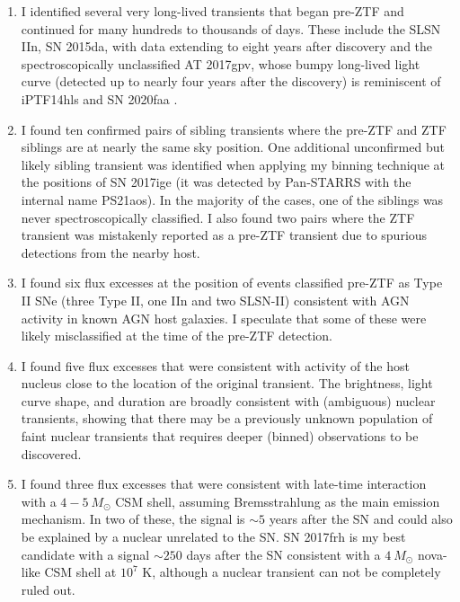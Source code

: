 \documentclass[a4paper,oneside,12pt, class=Latex/Classes/PhDthesisPSnPDF, crop=false]{standalone}
\begin{document}
\begin{enumerate}
    \item I identified several very long-lived transients that began pre-ZTF and continued for many hundreds to thousands of days. These include the SLSN IIn, SN 2015da, with data extending to eight years after discovery and the spectroscopically unclassified AT 2017gpv, whose bumpy long-lived light curve (detected up to nearly four years after the discovery) is reminiscent of iPTF14hls \citep{iPTF14hls_Iair, Sollerman_2019_iptf14hls} and SN 2020faa \citep{Yang_2021_20faa, 2020faa_hidden_shocks}. 
    \item I found ten confirmed pairs of sibling transients where the pre-ZTF and ZTF siblings are at nearly the same sky position. One additional unconfirmed but likely sibling transient was identified when applying my binning technique at the positions of SN 2017ige (it was detected by Pan-STARRS with the internal name PS21aos). In the majority of the cases, one of the siblings was never spectroscopically classified. I also found two pairs where the ZTF transient was mistakenly reported as a pre-ZTF transient due to spurious detections from the nearby host.
    \item I found six flux excesses at the position of events classified pre-ZTF as Type II SNe (three Type II, one IIn and two SLSN-II) consistent with AGN activity in known AGN host galaxies. I speculate that some of these were likely misclassified at the time of the pre-ZTF detection.
    \item I found five flux excesses that were consistent with activity of the host nucleus close to the location of the original transient. The brightness, light curve shape, and duration are broadly consistent with (ambiguous) nuclear transients, showing that there may be a previously unknown population of faint nuclear transients that requires deeper (binned) observations to be discovered.
    \item I found three flux excesses that were consistent with late-time interaction with a $4 - 5\ M_\odot$ CSM shell, assuming Bremsstrahlung as the main emission mechanism. In two of these, the signal is $\sim5$ years after the SN and could also be explained by a nuclear unrelated to the SN. SN 2017frh is my best candidate with a signal $\sim250$ days after the SN consistent with a $4\ M_\odot$ nova-like CSM shell at $10^7$ K, although a nuclear transient can not be completely ruled out.
 \end{enumerate}
\end{document}
